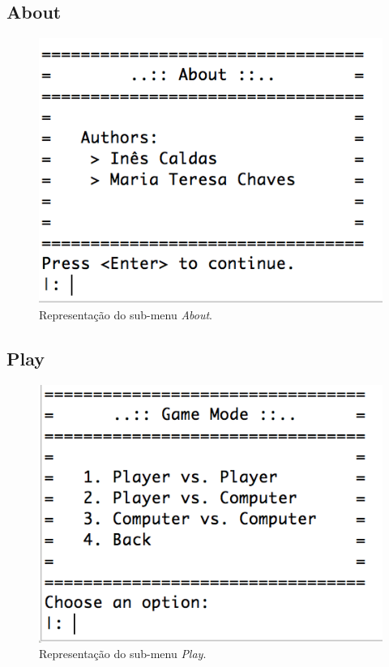 \documentclass[a4paper]{article}
\begin{document}
\newpage

\subsection{About}

\begin{figure}[!ht]
	\begin{center}
	\includegraphics[scale=0.5]{img/about_menu.png}
	\caption{Representação do sub-menu \textit{About}.}
    \label{Fig:about_menu}
	\end{center}
\end{figure}

\subsection{Play}

\begin{figure}[!ht]
	\begin{center}
	\includegraphics[scale=0.5]{img/play_menu.png}
	\caption{Representação do sub-menu \textit{Play}.}
    \label{Fig:play_menu}
	\end{center}
\end{figure}
\end{document}

